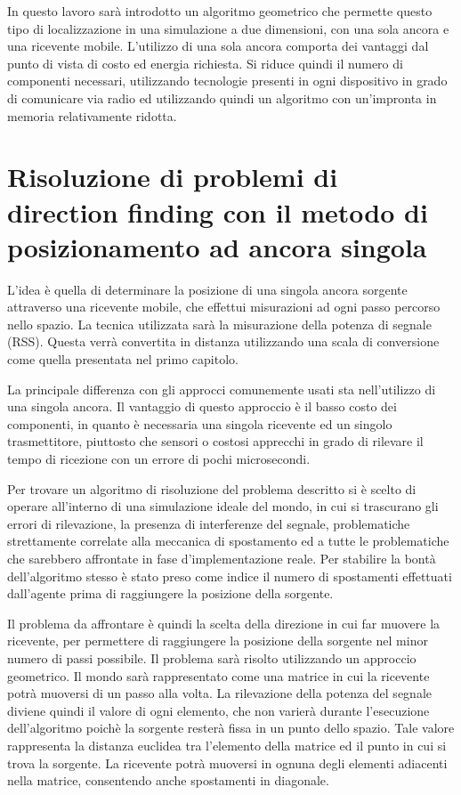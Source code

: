 In questo lavoro sarà introdotto un algoritmo geometrico che permette questo tipo di localizzazione in una simulazione a due dimensioni, con una sola ancora e una ricevente mobile. L'utilizzo di una sola ancora comporta dei vantaggi dal punto di vista di costo ed energia richiesta. Si riduce quindi il numero di componenti necessari, utilizzando tecnologie presenti in ogni dispositivo in grado di comunicare via radio ed utilizzando quindi un algoritmo con un'impronta in memoria relativamente ridotta.
	
\section{Risoluzione di problemi di direction finding con il metodo di posizionamento ad ancora singola}
L'idea è quella di determinare la posizione di una singola ancora sorgente attraverso una ricevente mobile, che effettui misurazioni ad ogni passo percorso nello spazio. La tecnica utilizzata sarà la misurazione della potenza di segnale (RSS). Questa verrà convertita in distanza utilizzando una scala di conversione come quella presentata nel primo capitolo.

La principale differenza con gli approcci comunemente usati sta nell'utilizzo di una singola ancora. 
Il vantaggio di questo approccio è il basso costo dei componenti, in quanto è necessaria una singola ricevente ed un singolo trasmettitore, piuttosto che sensori o costosi apprecchi in grado di rilevare il tempo di ricezione con un errore di pochi microsecondi.

Per trovare un algoritmo di risoluzione del problema descritto si è scelto di operare all'interno di una simulazione ideale del mondo, in cui si trascurano gli errori di rilevazione, la presenza di interferenze del segnale, problematiche strettamente correlate alla meccanica di spostamento ed a tutte le problematiche che sarebbero affrontate in fase d'implementazione reale. Per stabilire la bontà dell'algoritmo stesso è stato preso come indice il numero di spostamenti effettuati dall'agente prima di raggiungere la posizione della sorgente.

Il problema da affrontare è quindi la scelta della direzione in cui far muovere la ricevente, per permettere di raggiungere la posizione della sorgente nel minor numero di passi possibile. Il problema sarà risolto utilizzando un approccio geometrico. Il mondo sarà rappresentato come una matrice in cui la ricevente potrà muoversi di un passo alla volta. La rilevazione della potenza del segnale diviene quindi il valore di ogni elemento, che non varierà durante l'esecuzione dell'algoritmo poichè la sorgente resterà fissa in un punto dello spazio. Tale valore rappresenta la distanza euclidea tra l'elemento della matrice ed il punto in cui si trova la sorgente. La ricevente potrà muoversi in ognuna degli elementi adiacenti nella matrice, consentendo anche spostamenti in diagonale. 

